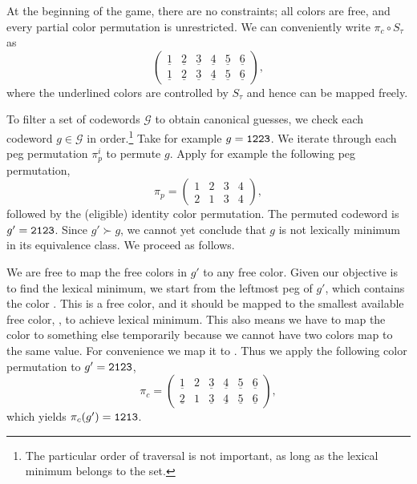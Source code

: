At the beginning of the game, there are no constraints; all colors are free, and every partial color permutation is unrestricted. We can conveniently write $\pi_c \circ S_\tau$ as
\[
\begin{pmatrix}
\underline{1} & \underline{2} & \underline{3} & \underline{4} & \underline{5} & \underline{6} \\
\underline{1} & \underline{2} & \underline{3} & \underline{4} & \underline{5} & \underline{6} 
\end{pmatrix} ,
\]
where the underlined colors are controlled by $S_\tau$ and hence can be mapped freely.

To filter a set of codewords $\mathcal{G}$ to obtain canonical guesses, we check each codeword $g \in \mathcal{G}$ in order.\footnote{The particular order of traversal is not important, as long as the lexical minimum belongs to the set.} 
Take for example $g = \texttt{1223}$. We iterate through each peg permutation $\pi_p^i$ to permute $g$. Apply for example the following peg permutation,
\[
\pi_p = 
\begin{pmatrix}
1 & 2 & 3 & 4 \\
2 & 1 & 3 & 4
\end{pmatrix} ,
\]
followed by the (eligible) identity color permutation.
The permuted codeword is $g' = \texttt{2123}$. Since $g' \succ g$, we cannot yet conclude that $g$ is not lexically minimum in its equivalence class. We proceed as follows.

We are free to map the free colors in $g'$ to any free color. Given our objective is to find the lexical minimum, we start from the leftmost peg of $g'$, which contains the color . This is a free color, and it should be mapped to the smallest available free color, , to achieve lexical minimum. This also means we have to map the color  to something else temporarily because we cannot have two colors map to the same value. For convenience we map it to . Thus we apply the following color permutation to $g' = \texttt{2123}$,
\[
\pi_c = 
\begin{pmatrix}
\underline{1} & 2 & \underline{3} & \underline{4} & \underline{5} & \underline{6} \\
\underline{2} & 1 & \underline{3} & \underline{4} & \underline{5} & \underline{6} 
\end{pmatrix} ,
\]
which yields $\pi_c(g') = \texttt{1213}$.

